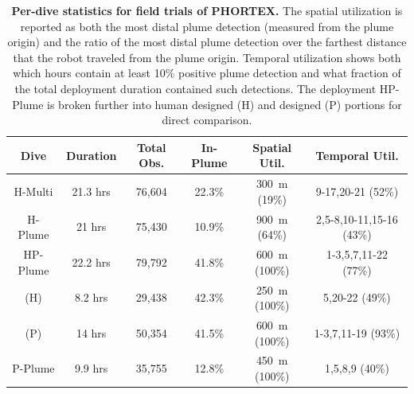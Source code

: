 \begin{table}[h!]
    \centering
    \begin{tabular}{c|c|c|c|c|c}
        Dive & Duration & Total Obs. & In-Plume & Spatial Util. & Temporal Util.  \\
        \hline
        H-Multi & 21.3 hrs & 76,604 & 22.3\% & \SI{300}{\meter} (19\%) & 9-17,20-21 (52\%) \\
        \hline
        H-Plume & 21 hrs & 75,430 & 10.9\% & \SI{900}{\meter} (64\%) & 2,5-8,10-11,15-16 (43\%) \\
        \hline
        HP-Plume & 22.2 hrs & 79,792 & 41.8\% & \SI{600}{\meter} (100\%) & 1-3,5,7,11-22 (77\%) \\
        (H) & 8.2 hrs & 29,438 & 42.3\% & \SI{250}{\meter} (100\%) & 5,20-22 (49\%) \\
        (P) & 14 hrs & 50,354 & 41.5\% & \SI{600}{\meter} (100\%) & 1-3,7,11-19 (93\%)\\
        \hline
        P-Plume & 9.9 hrs & 35,755 & 12.8\% & \SI{450}{\meter} (100\%) & 1,5,8,9 (40\%)
    \end{tabular}
    \caption[Per-dive statistics for field trials of \PHORTEX.]{\textbf{Per-dive statistics for field trials of PHORTEX.} The spatial utilization is reported as both the most distal plume detection (measured from the plume origin) and the ratio of the most distal plume detection over the farthest distance that the robot traveled from the plume origin. Temporal utilization shows both which hours contain at least 10\% positive plume detection and what fraction of the total deployment duration contained such detections. The deployment HP-Plume is broken further into human designed (H) and \PHORTEX designed (P) portions for direct comparison.}
    \label{tab:field_results}
\end{table}

